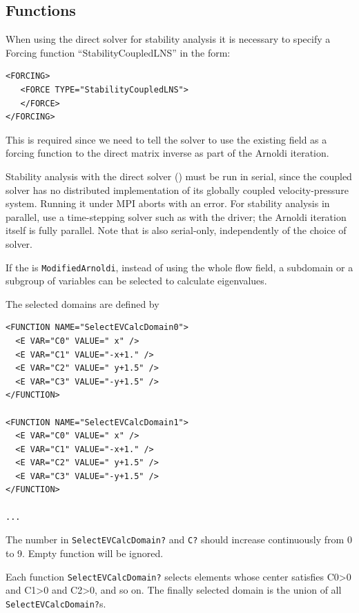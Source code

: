 \subsection{Functions}
When using the direct solver for stability analysis it is necessary to specify a Forcing function ``StabilityCoupledLNS'' in the form:
\begin{lstlisting}[style=XMLStyle]
<FORCING>
   <FORCE TYPE="StabilityCoupledLNS">
   </FORCE>
</FORCING>
\end{lstlisting}

This is required since we need to tell the solver to use the existing
field as a forcing function to the direct matrix inverse as part of
the Arnoldi iteration.

\begin{warningbox}
  Stability analysis with the direct solver
  () must be run in serial, since the
  coupled solver has no distributed implementation of its globally coupled
  velocity-pressure system. Running it under MPI aborts with an error. For
  stability analysis in parallel, use a time-stepping solver such as
   with the  driver; the
  Arnoldi iteration itself is fully parallel. Note that  is also
  serial-only, independently of the choice of solver.
\end{warningbox}

If the  is \texttt{ModifiedArnoldi}, instead of using the whole flow field, a subdomain or a subgroup of variables can be selected to calculate eigenvalues.

The selected domains are defined by
\begin{lstlisting}[style=XMLStyle]
<FUNCTION NAME="SelectEVCalcDomain0">
  <E VAR="C0" VALUE=" x" />
  <E VAR="C1" VALUE="-x+1." />
  <E VAR="C2" VALUE=" y+1.5" />
  <E VAR="C3" VALUE="-y+1.5" />
</FUNCTION>

<FUNCTION NAME="SelectEVCalcDomain1">
  <E VAR="C0" VALUE=" x" />
  <E VAR="C1" VALUE="-x+1." />
  <E VAR="C2" VALUE=" y+1.5" />
  <E VAR="C3" VALUE="-y+1.5" />
</FUNCTION>

...
\end{lstlisting}
The number in \texttt{SelectEVCalcDomain?} and \texttt{C?} should increase continuously from 0 to 9. Empty function will be ignored.

Each function \texttt{SelectEVCalcDomain?} selects elements whose center satisfies C0>0 and C1>0 and C2>0, and so on.
The finally selected domain is the union of all \texttt{SelectEVCalcDomain?}s.


